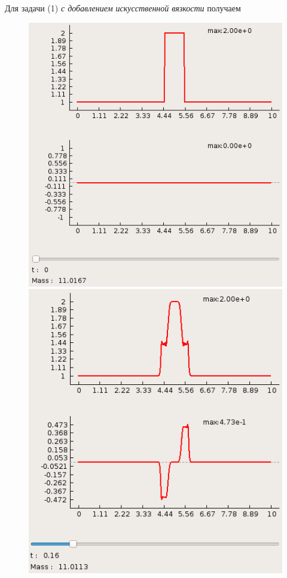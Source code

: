 \documentclass[a4paper, 11pt]{article}
\begin{document}
Для задачи (1) \textit{с добавлением искусственной вязкости} получаем
\begin{figure}[H]
	\begin{minipage}[H] {0.49\linewidth}
		\includegraphics[width=1\linewidth]{p1/p1_t=0.png}
	\end{minipage}
	\begin{minipage}[H] {0.49\linewidth}
		\includegraphics[width=1\linewidth]{p1/p1_t=0,16_supr.png}

\end{minipage}
\end{figure}
\end{document}
